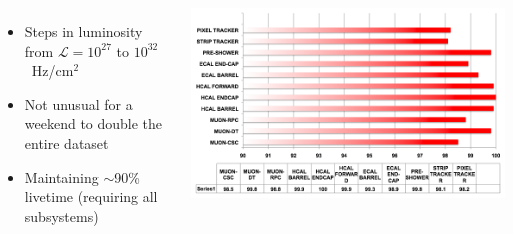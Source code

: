 \documentclass[compress]{beamer}
\begin{document}
\begin{frame}
\begin{columns}
\begin{itemize}
\item Steps in luminosity from $\mathcal{L} = 10^{27}$ to
  $10^{32}$~Hz/cm$^2$
\item Not unusual for a weekend to double the entire dataset
\item Maintaining $\sim$90\% livetime (requiring all subsystems)
\end{itemize}

\includegraphics[width=\linewidth]{livetime.png}
\end{columns}
\end{frame}
\end{document}
